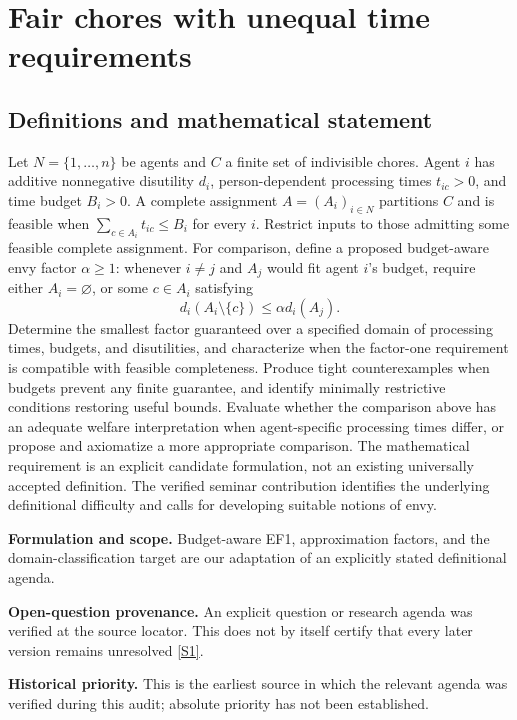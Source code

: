 \documentclass[11pt]{article}
\newcommand{\sref}[2]{\hyperlink{source:#1:#2}{[S#2]}}
\begin{document}
\section*{Fair chores with unequal time requirements}\label{30007559}
\subsection{Definitions and mathematical statement}
Let \(N=\{1,\ldots,n\}\) be agents and \(C\) a finite set of indivisible chores. Agent \(i\) has additive nonnegative disutility \(d_i\), person-dependent processing times \(t_{ic}>0\), and time budget \(B_i>0\). A complete assignment \(A=(A_i)_{i\in N}\) partitions \(C\) and is feasible when \(\sum_{c\in A_i}t_{ic}\leq B_i\) for every \(i\). Restrict inputs to those admitting some feasible complete assignment. For comparison, define a proposed budget-aware envy factor \(\alpha\geq1\): whenever \(i\ne j\) and \(A_j\) would fit agent \(i\)'s budget, require either \(A_i=\varnothing\), or some \(c\in A_i\) satisfying
\[
 d_i(A_i\setminus\{c\})\leq\alpha d_i(A_j).
\]
Determine the smallest factor guaranteed over a specified domain of processing times, budgets, and disutilities, and characterize when the factor-one requirement is compatible with feasible completeness. Produce tight counterexamples when budgets prevent any finite guarantee, and identify minimally restrictive conditions restoring useful bounds. Evaluate whether the comparison above has an adequate welfare interpretation when agent-specific processing times differ, or propose and axiomatize a more appropriate comparison. The mathematical requirement is an explicit candidate formulation, not an existing universally accepted definition. The verified seminar contribution identifies the underlying definitional difficulty and calls for developing suitable notions of envy.

\par\textbf{Formulation and scope.} Budget-aware EF1, approximation factors, and the domain-classification target are our adaptation of an explicitly stated definitional agenda.

\par\textbf{Open-question provenance.} An explicit question or research agenda was verified at the source locator. This does not by itself certify that every later version remains unresolved \sref{30007559}{1}.

\par\textbf{Historical priority.} This is the earliest source in which the relevant agenda was verified during this audit; absolute priority has not been established.
\end{document}
